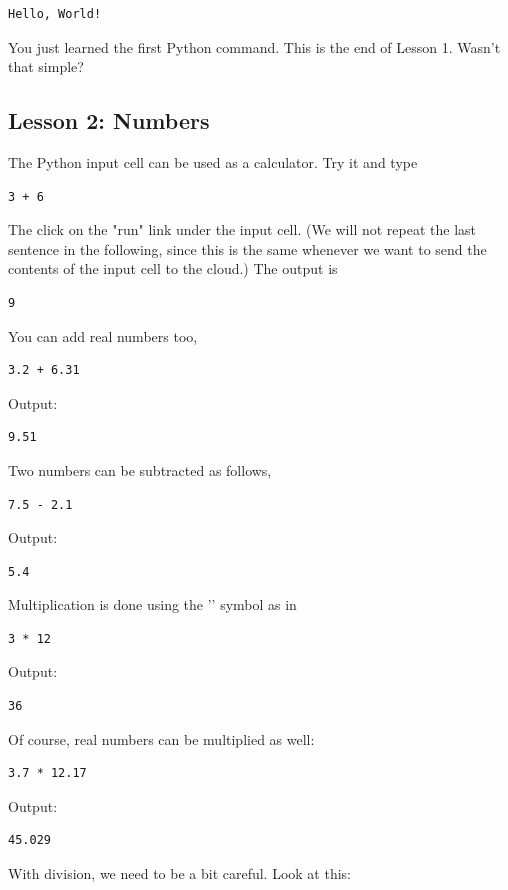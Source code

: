 \documentclass[article,A4,12pt]{llncs}
\begin{document}
\begin{verbatim}
Hello, World!
\end{verbatim}
You just learned the first Python command. This is the end of Lesson 1. Wasn't that simple?

\subsection{Lesson 2: Numbers}

The Python input cell can be used as a calculator. Try it and type 

\begin{verbatim}
3 + 6
\end{verbatim}
The click on the "run" link under the input cell. (We will not repeat the last sentence 
in the following, since this is the same whenever we want to send the contents of the input 
cell to the cloud.) The output is

\begin{verbatim}
9
\end{verbatim}
You can add real numbers too,
\begin{verbatim}
3.2 + 6.31
\end{verbatim}
Output:

\begin{verbatim}
9.51
\end{verbatim}
Two numbers can be subtracted as follows,

\begin{verbatim}
7.5 - 2.1
\end{verbatim}
Output:

\begin{verbatim}
5.4
\end{verbatim}
Multiplication is done using the '{\tt *}' symbol as in

\begin{verbatim}
3 * 12
\end{verbatim}
Output:

\begin{verbatim}
36
\end{verbatim}
Of course, real numbers can be multiplied as well:

\begin{verbatim}
3.7 * 12.17
\end{verbatim}
Output:

\begin{verbatim}
45.029
\end{verbatim}
With division, we need to be a bit careful. Look at this:
\end{document}
